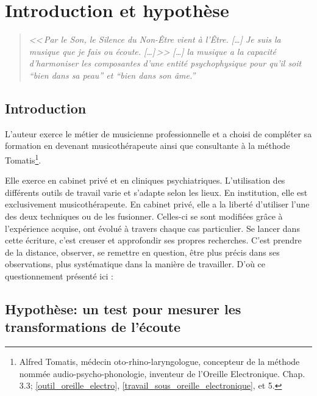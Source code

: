\chapter{Introduction et hypothèse}
\label{jeSuisLaMusique:viret}
\begin{quotation}
\emph{<<\,\emph{Par le Son, le Silence du Non-Être vient à l'Être}. [\dots] 
\textsl{Je suis}
	\emph{la musique que je fais ou écoute}. [\dots]\,>>
[\ldots] \emph{la musique a la capacité d'harmoniser
les composantes d'une entité psychophysique pour qu'il soit ``bien
dans sa peau'' et ``bien dans son âme.}''}\, \autocite[ch. 1,  p. 8]{viret:b}
\end{quotation}

\section{Introduction}

L'auteur exerce le métier de musicienne professionnelle et a  choisi de 
compléter sa formation en devenant musicothérapeute  ainsi que consultante à la 
méthode Tomatis\footnote{Alfred Tomatis, médecin oto-rhino-laryngologue, 
concepteur de la méthode nommée audio-psycho-phonologie, inventeur de l'Oreille 
Electronique. Chap. 3.3; \ref{outil_oreille_electro},
 \ref{travail_sous_oreille_electronique}, et 5.}.  



Elle exerce en cabinet privé et en cliniques psychiatriques. L'utilisation des 
différents outils de travail varie et s'adapte selon les lieux. En institution, 
elle est exclusivement musicothérapeute. En cabinet
privé, elle a la liberté d'utiliser l'une des deux techniques ou de les 
fusionner. Celles-ci se sont modifiées grâce à  l'expérience acquise, ont 
évolué  
à travers chaque cas particulier.
 Se lancer dans cette écriture, c'est creuser et approfondir ses propres 
recherches. C'est prendre de la distance, observer, se remettre en question, 
être plus précis dans ses observations, plus systématique dans la manière de 
travailler. D'où ce questionnement présenté ici : 


\section{Hypothèse: un test pour mesurer les trans\-for\-ma\-tions de l'écoute}

